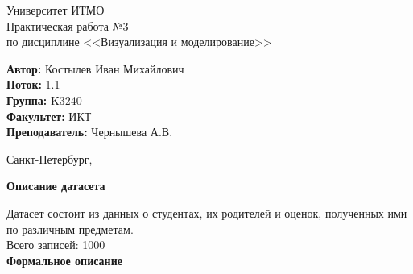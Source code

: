 \documentclass[12pt,a4paper]{article}
\begin{document}
	
\begin{titlepage}
	
\begin{center}
	\large Университет ИТМО\\[5cm]
	\LARGE Практическая работа №3\\
	\normalsize по дисциплине <<Визуализация и моделирование>>\\[5cm]
\end{center}
\begin{flushright}
		\begin{minipage}{0.6\textwidth}
		\begin{flushleft}
			\large
			\singlespacing 
			\textbf{Автор:} Костылев Иван Михайлович\\
			\textbf{Поток:} 1.1\\
			\textbf{Группа:} K3240\\
			\textbf{Факультет:} ИКТ\\
			\textbf{Преподаватель:} Чернышева А.В.
		\end{flushleft}
	\end{minipage}
\end{flushright}

\vfill

\begin{center}
	{\large Санкт-Петербург, \the{}}
\end{center}
 
\end{titlepage}
\normalsize


\large \textbf{Описание датасета}

\normalsize
	Датасет состоит из данных о студентах, их родителей и оценок, полученных ими по различным предметам. \\

Всего записей: 1000 \\


\large \textbf{Формальное описание}
\end{document}
